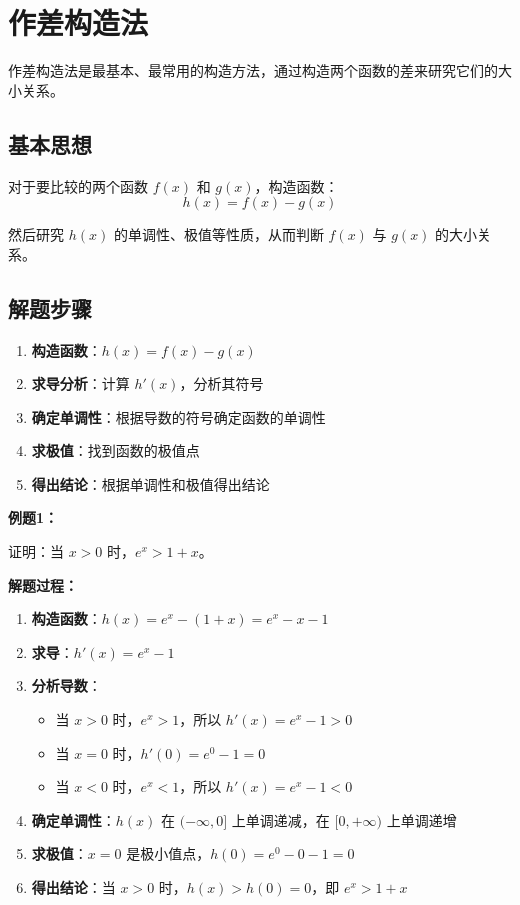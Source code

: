 \documentclass[a4paper,11pt]{ctexrep}
\newcommand{\exampleicon}{\ModeBadge[highlight]{例题}}
\newcommand{\analysisicon}{\ModeBadge[secondary]{分析}}
\theoremstyle{definition}
\begin{document}
\section{作差构造法}

作差构造法是最基本、最常用的构造方法，通过构造两个函数的差来研究它们的大小关系。

\subsection{基本思想}

对于要比较的两个函数 $f(x)$ 和 $g(x)$，构造函数：
$$h(x) = f(x) - g(x)$$

然后研究 $h(x)$ 的单调性、极值等性质，从而判断 $f(x)$ 与 $g(x)$ 的大小关系。

\subsection{解题步骤}

\begin{methodbox}[作差构造法解题步骤]
\begin{enumerate}
    \item \textbf{构造函数}：$h(x) = f(x) - g(x)$
    \item \textbf{求导分析}：计算 $h'(x)$，分析其符号
    \item \textbf{确定单调性}：根据导数的符号确定函数的单调性
    \item \textbf{求极值}：找到函数的极值点
    \item \textbf{得出结论}：根据单调性和极值得出结论
\end{enumerate}
\end{methodbox}

\exampleicon \textbf{例题1：}

证明：当 $x > 0$ 时，$e^x > 1 + x$。

\analysisicon \textbf{解题过程：}

\begin{enumerate}
    \item \textbf{构造函数}：$h(x) = e^x - (1 + x) = e^x - x - 1$
    \item \textbf{求导}：$h'(x) = e^x - 1$
    \item \textbf{分析导数}：
    \begin{itemize}
        \item 当 $x > 0$ 时，$e^x > 1$，所以 $h'(x) = e^x - 1 > 0$
        \item 当 $x = 0$ 时，$h'(0) = e^0 - 1 = 0$
        \item 当 $x < 0$ 时，$e^x < 1$，所以 $h'(x) = e^x - 1 < 0$
    \end{itemize}
    \item \textbf{确定单调性}：$h(x)$ 在 $(-\infty, 0]$ 上单调递减，在 $[0, +\infty)$ 上单调递增
    \item \textbf{求极值}：$x = 0$ 是极小值点，$h(0) = e^0 - 0 - 1 = 0$
    \item \textbf{得出结论}：当 $x > 0$ 时，$h(x) > h(0) = 0$，即 $e^x > 1 + x$
\end{enumerate}
\end{document}

